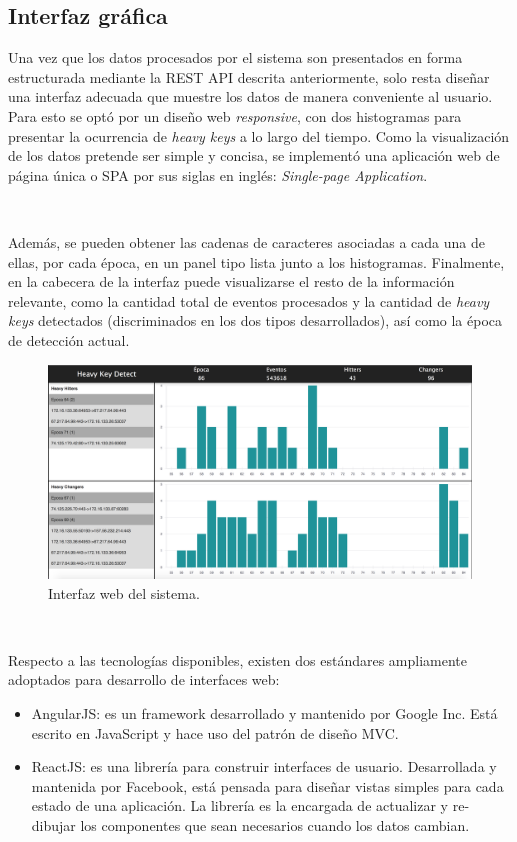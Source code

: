 \documentclass[a4paper,12pt, oneside]{article}
\begin{document}
\subsection{Interfaz gráfica}

Una vez que los datos procesados por el sistema son presentados en forma estructurada mediante la REST API descrita anteriormente, solo resta diseñar una interfaz adecuada que muestre los datos de manera conveniente al usuario. Para esto se optó por un diseño web \textit{responsive}, con dos histogramas para presentar la ocurrencia de \textit{heavy keys} a lo largo del tiempo. Como la visualización de los datos pretende ser simple y concisa, se implementó una aplicación web de página única o SPA por sus siglas en inglés: \textit{Single-page Application}.

\

Además, se pueden obtener las cadenas de caracteres asociadas a cada una de ellas, por cada época, en un panel tipo lista junto a los histogramas. Finalmente, en la cabecera de la interfaz puede visualizarse el resto de la información relevante, como la cantidad total de eventos procesados y la cantidad de \textit{heavy keys} detectados (discriminados en los dos tipos desarrollados), así como la época de detección actual.

\begin{figure}[h]
	\centering
	\includegraphics[width=1\textwidth]{./graph/ui.png}
	\caption{Interfaz web del sistema.}
	\label{diag:ui}
\end{figure}

\

Respecto a las tecnologías disponibles, existen dos estándares ampliamente adoptados para desarrollo de interfaces web:
\begin{itemize}
	\item AngularJS: es un framework desarrollado y mantenido por Google Inc. Está escrito en JavaScript y hace uso del patrón de diseño MVC.
	\item ReactJS: es una librería para construir interfaces de usuario. Desarrollada y mantenida por Facebook, está pensada para diseñar vistas simples para cada estado de una aplicación. La librería es la encargada de actualizar y re-dibujar los componentes que sean necesarios cuando los datos cambian.
\end{itemize}
\end{document}
